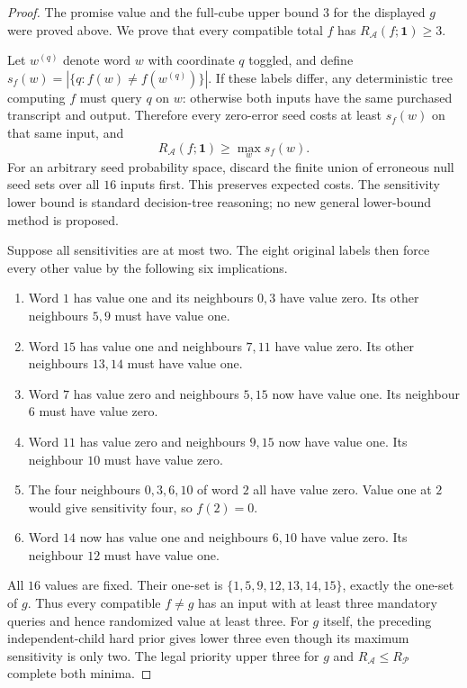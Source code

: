 \begin{proof}
The promise value and the full-cube upper bound $3$ for the displayed
$g$ were proved above. We prove that every compatible total $f$ has
$R_{\mathcal A}(f;\mathbf1)\ge3$.

Let $w^{(q)}$ denote word $w$ with coordinate $q$ toggled, and define
$s_f(w)=|\{q:f(w)\ne f(w^{(q)})\}|$. If these labels differ, any
deterministic tree computing $f$ must query $q$ on $w$: otherwise both
inputs have the same purchased transcript and output. Therefore every
zero-error seed costs at least $s_f(w)$ on that same input, and
\[
 R_{\mathcal A}(f;\mathbf1)\ge\max_w s_f(w).
\]
For an arbitrary seed probability space, discard the finite union of
erroneous null seed sets over all $16$ inputs first. This preserves
expected costs. The sensitivity lower bound is standard decision-tree
reasoning; no new general lower-bound method is proposed.

Suppose all sensitivities are at most two. The eight original labels
then force every other value by the following six implications.
\begin{enumerate}
 \item Word $1$ has value one and its neighbours $0,3$ have value zero.
 Its other neighbours $5,9$ must have value one.
 \item Word $15$ has value one and neighbours $7,11$ have value zero.
 Its other neighbours $13,14$ must have value one.
 \item Word $7$ has value zero and neighbours $5,15$ now have value one.
 Its neighbour $6$ must have value zero.
 \item Word $11$ has value zero and neighbours $9,15$ now have value one.
 Its neighbour $10$ must have value zero.
 \item The four neighbours $0,3,6,10$ of word $2$ all have value zero.
 Value one at $2$ would give sensitivity four, so $f(2)=0$.
 \item Word $14$ now has value one and neighbours $6,10$ have value zero.
 Its neighbour $12$ must have value one.
\end{enumerate}
All $16$ values are fixed. Their one-set is
$\{1,5,9,12,13,14,15\}$, exactly the one-set of $g$. Thus every
compatible $f\ne g$ has an input with at least three mandatory queries
and hence randomized value at least three. For $g$ itself, the preceding
independent-child hard prior gives lower three even though its maximum
sensitivity is only two. The legal priority upper three for $g$ and
$R_{\mathcal A}\le R_{\mathcal P}$ complete both minima.
\end{proof}

